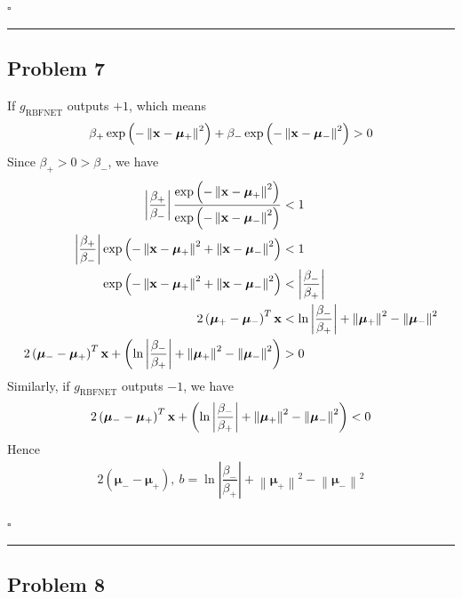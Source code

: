 \documentclass[12pt]{article}
\newcommand*{\QEDB}{\hfill\ensuremath{\square}}
\newcommand{\ParTh}[1]{\left(#1\right)}
\newcommand{\BF}[1]{{\bf#1}}
\newcommand{\AbsVal}[1]{\left|#1\right|}
\newcommand{\VecAbsVal}[1]{\left\|#1\right\|}
\newcommand{\horrule}[1]{\rule{\linewidth}{#1}}
\begin{document}
\QEDB

\horrule{0.5pt}

\subsection*{Problem 7}

If $g_{\text{RBFNET}}$ outputs $+1$, which means
\begin{align}
\beta_+\exp\ParTh{-\VecAbsVal{\BF{x}-\bm{\mu}_+}^2}+\beta_-\exp\ParTh{-\VecAbsVal{\BF{x}-\bm{\mu}_-}^2}>0
\end{align}
Since $\beta_+>0>\beta_-$, we have
\begin{align}
\AbsVal{\dfrac{\beta_+}{\beta_-}}\dfrac{\exp\ParTh{-\VecAbsVal{\BF{x}-\bm{\mu}_+}^2}}{\exp\ParTh{-\VecAbsVal{\BF{x}-\bm{\mu}_-}^2}}&<1\\
\AbsVal{\dfrac{\beta_+}{\beta_-}}\exp\ParTh{-\VecAbsVal{\BF{x}-\bm{\mu}_+}^2+\VecAbsVal{\BF{x}-\bm{\mu}_-}^2}&<1\\
\exp\ParTh{-\VecAbsVal{\BF{x}-\bm{\mu}_+}^2+\VecAbsVal{\BF{x}-\bm{\mu}_-}^2}&<\AbsVal{\dfrac{\beta_-}{\beta_+}}\\
2\ParTh{\bm{\mu}_+-\bm{\mu}_-}^T\BF{x}&<\ln\AbsVal{\dfrac{\beta_-}{\beta_+}}+\VecAbsVal{\bm{\mu}_+}^2-\VecAbsVal{\bm{\mu}_-}^2\\
2\ParTh{\bm{\mu}_--\bm{\mu}_+}^T\BF{x}+\ParTh{\ln\AbsVal{\dfrac{\beta_-}{\beta_+}}+\VecAbsVal{\bm{\mu}_+}^2-\VecAbsVal{\bm{\mu}_-}^2}&>0
\end{align}
Similarly, if $g_{\text{RBFNET}}$ outputs $-1$, we have
\begin{align}
2\ParTh{\bm{\mu}_--\bm{\mu}_+}^T\BF{x}+\ParTh{\ln\AbsVal{\dfrac{\beta_-}{\beta_+}}+\VecAbsVal{\bm{\mu}_+}^2-\VecAbsVal{\bm{\mu}_-}^2}<0
\end{align}
Hence
\begin{align}
2\ParTh{\bm{\mu}_--\bm{\mu}_+},~b=\ln\AbsVal{\dfrac{\beta_-}{\beta_+}}+\VecAbsVal{\bm{\mu}_+}^2-\VecAbsVal{\bm{\mu}_-}^2
\end{align}

\QEDB

\horrule{0.5pt}

\subsection*{Problem 8}
\end{document}
